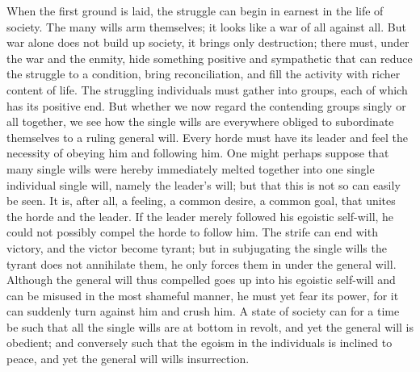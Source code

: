 \documentclass[12pt]{book}
\begin{document}
When the first ground is laid, the struggle can begin in earnest in the life of society. The many
wills arm themselves; it looks like a war of all against all. But war alone does not build up
society, it brings only destruction; there must, under the war and the enmity, hide something
positive and sympathetic that can reduce the struggle to a condition, bring reconciliation, and
fill the activity with richer content of life. The struggling individuals must gather into groups,
each of which has its positive end. But whether we now regard the contending groups singly or all
together, we see how the single wills are everywhere obliged to subordinate themselves to a ruling
general will. Every horde must have its leader and feel the necessity of obeying him and following
him. One might perhaps suppose that many single wills were hereby immediately melted together into
one single individual single will, namely the leader's will; but that this is not so can easily be
seen. It is, after all, a feeling, a common desire, a common goal, that unites the horde and the
leader. If the leader merely followed his egoistic self-will, he could not possibly compel the
horde to follow him. The strife can end with victory, and the victor become tyrant; but in
subjugating the single wills the tyrant does not annihilate them, he only forces them in under the
general will. Although the general will thus compelled goes up into his egoistic self-will and can
be misused in the most shameful manner, he must yet fear its power, for it can suddenly turn against
him and crush him. A state of society can for a time be such that all the single wills are at bottom
in revolt, and yet the general will is obedient; and conversely such that the egoism in the
individuals is inclined to peace, and yet the general will wills insurrection.
\end{document}

